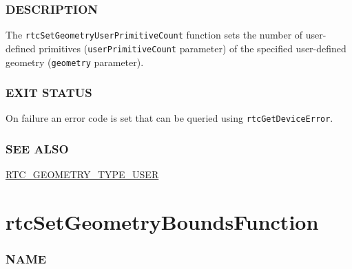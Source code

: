 \begin{Shaded}
\begin{Highlighting}[]

\OperatorTok{(}
\OperatorTok{,}
   
\OperatorTok{);}
\end{Highlighting}
\end{Shaded}

\subsubsection{DESCRIPTION}\label{description}

The \texttt{rtcSetGeometryUserPrimitiveCount} function sets the number
of user-defined primitives (\texttt{userPrimitiveCount} parameter) of
the specified user-defined geometry (\texttt{geometry} parameter).

\subsubsection{EXIT STATUS}\label{exit-status}

On failure an error code is set that can be queried using
\texttt{rtcGetDeviceError}.

\subsubsection{SEE ALSO}\label{see-also}

\hyperref[rtc_geometry_type_user]{RTC\_GEOMETRY\_TYPE\_USER}

\pagebreak

\section{rtcSetGeometryBoundsFunction}\label{rtcsetgeometryboundsfunction}

\subsubsection{NAME}\label{name}

\begin{Shaded}
\begin{Highlighting}[]
\OperatorTok{{-}}
\OperatorTok{{-}}
\end{Highlighting}
\end{Shaded}

